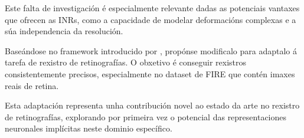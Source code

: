 Este falta de investigación é especialmente relevante dadas as potenciais vantaxes que ofrecen as INRs, como a capacidade de modelar deformacións complexas e a súa independencia da resolución.

Baseándose no framework introducido por \cite{wolterink2021implicit}, propónse modificalo para adaptalo á tarefa de rexistro de retinografías. O obxetivo é conseguir rexistros consistentemente precisos, especialmente no dataset de FIRE que contén imaxes reais de retina.

Esta adaptación representa unha contribución novel ao estado da arte no rexistro de retinografías, explorando por primeira vez o potencial das representaciones neuronales implícitas neste dominio específico.

